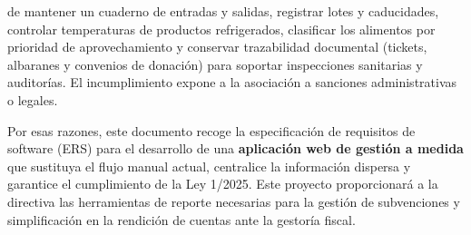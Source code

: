 de mantener un cuaderno de entradas y salidas, registrar lotes y caducidades,
controlar temperaturas de productos refrigerados, clasificar los alimentos por
prioridad de aprovechamiento y conservar trazabilidad documental (tickets,
albaranes y convenios de donación) para soportar inspecciones sanitarias y
auditorías. El incumplimiento expone a la asociación a sanciones administrativas o legales.
\par
\vspace{5mm}
Por esas razones, este documento recoge la especificación de requisitos de software (ERS)
para el desarrollo de una \textbf{aplicación web de gestión a medida} que sustituya
el flujo manual actual, centralice la información dispersa y garantice el
cumplimiento de la Ley 1/2025. Este proyecto proporcionará a la directiva las herramientas de
reporte necesarias para la gestión de subvenciones y simplificación en la rendición de cuentas
ante la gestoría fiscal.



